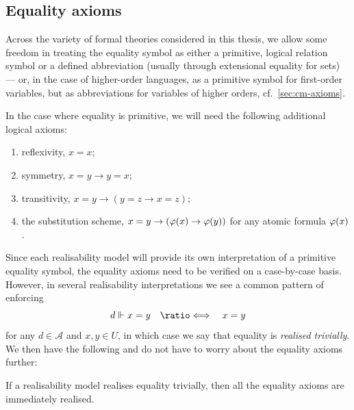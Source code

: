 \documentclass[12pt,openany]{book}
\makeatletter
\newcommand\indg[1]{\index{A@General!#1}}
\theoremstyle{plain}
\theoremstyle{definition}
\newcommand\uplabel[1]{\textup{(#1)}}
\newcommand\defeqv{\quad \ratio\Longleftrightarrow \quad}
\makeatother
\begin{document}
\subsection*{Equality axioms}
\indg{equality axioms}

Across the variety of formal theories considered in this thesis, we allow some freedom in treating the equality symbol as either a primitive, logical relation symbol or a defined abbreviation (usually through extensional equality for sets) --- or, in the case of higher-order languages, as a primitive symbol for first-order variables, but as abbreviations for variables of higher orders, cf.\ \autoref{sec:cm-axioms}.

In the case where equality is primitive, we will need the following additional logical axioms:
\begin{enumerate}[label=\uplabel{E\arabic*}]
  \item \label{itm:eq-refl-axiom} reflexivity, $x = x$;
  \item symmetry, $x = y \rightarrow y = x$;
  \item transitivity, $x = y \rightarrow \left(y = z \rightarrow x = z\right)$;
  \item \label{itm:eq-sub-axiom} the substitution scheme, $x = y \rightarrow \left(\varphi\mleft(x\mright) \rightarrow \varphi\mleft(y\mright)\right)$ for any atomic formula $\varphi\mleft(x\mright)$.
\end{enumerate}

Since each realisability model will provide its own interpretation of a primitive equality symbol, the equality axioms need to be verified on a case-by-case basis. However, in several realisability interpretations we see a common pattern of enforcing
\[d \Vdash x = y \defeqv x = y\]
for any $d \in \mathcal{A}$ and $x, y \in U$, in which case we say that equality is \emph{realised trivially}. We then have the following and do not have to worry about the equality axioms further:
\begin{lemma}
  \label{lem:eq-axiom-trivial}
  If a realisability model realises equality trivially, then all the equality axioms are immediately realised.
\end{lemma}
\end{document}
